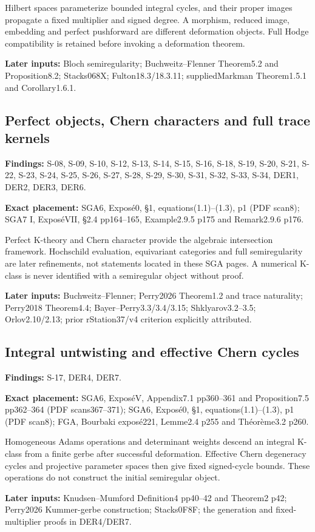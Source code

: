 \documentclass[11pt,a4paper]{article}
\theoremstyle{definition}
\begin{document}
Hilbert spaces parameterize bounded integral cycles, and their proper
images propagate a fixed multiplier and signed degree. A morphism,
reduced image, embedding and perfect pushforward are different
deformation objects. Full Hodge compatibility is retained before
invoking a deformation theorem.

\textbf{Later inputs:} Bloch semiregularity; Buchweitz--Flenner
Theorem5.2 and Proposition8.2; Stacks068X; Fulton18.3/18.3.11;
suppliedMarkman Theorem1.5.1 and Corollary1.6.1.

\subsection{Perfect objects, Chern characters and full trace
kernels}\label{FRAMEWORK-perfect-objects-chern-characters-and-full-trace-kernels}

\textbf{Findings:} S-08, S-09, S-10, S-12, S-13, S-14, S-15, S-16, S-18,
S-19, S-20, S-21, S-22, S-23, S-24, S-25, S-26, S-27, S-28, S-29, S-30,
S-31, S-32, S-33, S-34, DER1, DER2, DER3, DER6.

\textbf{Exact placement:} SGA6, Exposé0, §1, equations(1.1)--(1.3), p1
(PDF scan8); SGA7 I, ExposéVII, §2.4 pp164--165, Example2.9.5 p175 and
Remark2.9.6 p176.

Perfect K-theory and Chern character provide the algebraic intersection
framework. Hochschild evaluation, equivariant categories and full
semiregularity are later refinements, not statements located in these
SGA pages. A numerical K-class is never identified with a semiregular
object without proof.

\textbf{Later inputs:} Buchweitz--Flenner; Perry2026 Theorem1.2 and
trace naturality; Perry2018 Theorem4.4; Bayer--Perry3.3/3.4/3.15;
Shklyarov3.2--3.5; Orlov2.10/2.13; prior rStation37/v4 criterion
explicitly attributed.

\subsection{Integral untwisting and effective Chern
cycles}\label{FRAMEWORK-integral-untwisting-and-effective-chern-cycles}

\textbf{Findings:} S-17, DER4, DER7.

\textbf{Exact placement:} SGA6, ExposéV, Appendix7.1 pp360--361 and
Proposition7.5 pp362--364 (PDF scans367--371); SGA6, Exposé0, §1,
equations(1.1)--(1.3), p1 (PDF scan8); FGA, Bourbaki exposé221, Lemme2.4
p255 and Théorème3.2 p260.

Homogeneous Adams operations and determinant weights descend an integral
K-class from a finite gerbe after successful deformation. Effective
Chern degeneracy cycles and projective parameter spaces then give fixed
signed-cycle bounds. These operations do not construct the initial
semiregular object.

\textbf{Later inputs:} Knudsen--Mumford Definition4 pp40--42 and
Theorem2 p42; Perry2026 Kummer-gerbe construction; Stacks0F8F; the
generation and fixed-multiplier proofs in DER4/DER7.
\end{document}
